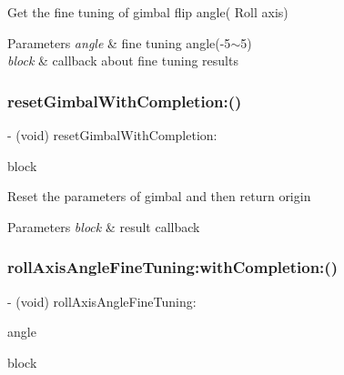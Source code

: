 Get the fine tuning of gimbal flip angle( Roll axis)


\begin{DoxyParams}{Parameters}
{\em angle} & fine tuning angle(-\/5$\sim$5) \\
\hline
{\em block} & callback about fine tuning results \\
\hline
\end{DoxyParams}
\mbox{\label{interface_p_v_gimabal_ad89b5c7c17d403b8c19e64b7a827db37}} 
\subsubsection{\texorpdfstring{reset\+Gimbal\+With\+Completion\+:()}{resetGimbalWithCompletion:()}}
{\footnotesize\ttfamily -\/ (void) reset\+Gimbal\+With\+Completion\+: \begin{DoxyParamCaption}\item[{(P\+V\+Completion\+Block)}]{block }\end{DoxyParamCaption}}

Reset the parameters of gimbal and then return origin


\begin{DoxyParams}{Parameters}
{\em block} & result callback \\
\hline
\end{DoxyParams}
\mbox{\label{interface_p_v_gimabal_af41d05f3ab40b6d7cd6bf8c1cd899da8}} 
\subsubsection{\texorpdfstring{roll\+Axis\+Angle\+Fine\+Tuning\+:with\+Completion\+:()}{rollAxisAngleFineTuning:withCompletion:()}}
{\footnotesize\ttfamily -\/ (void) roll\+Axis\+Angle\+Fine\+Tuning\+: \begin{DoxyParamCaption}\item[{(float)}]{angle }\item[{withCompletion:(P\+V\+Completion\+Block)}]{block }\end{DoxyParamCaption}}

